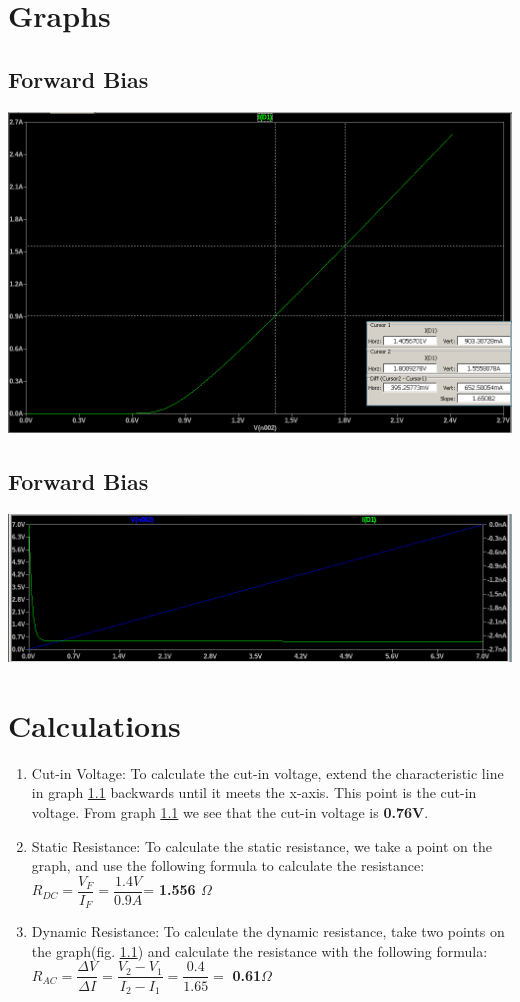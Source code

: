 \documentclass{article}
\begin{document}
	\section{Graphs}
	\subsection{Forward Bias}
		\label{graph:fwd-bias}
		\includegraphics[width=1\linewidth]{"forward bias graph"}
	\subsection{Forward Bias}
		\label{graph:rev-bias}
		\includegraphics[width=1\linewidth]{"reverse bias graph"}
		
	\section{Calculations}
	\begin{enumerate}
		\item Cut-in Voltage: To calculate the cut-in voltage, extend the characteristic line in graph \ref{graph:fwd-bias} backwards until it meets the x-axis. This point is the cut-in voltage. From graph \ref{graph:fwd-bias} we see that the cut-in voltage is \textbf{0.76V}.
		\item Static Resistance: To calculate the static resistance, we take a point on the graph, and use the following formula to calculate the resistance: \\ $ R_{DC}  =\dfrac{V_F}{I_F} = \dfrac{1.4V}{0.9A}$= \textbf{1.556 $ \Omega $}
		\item Dynamic Resistance: To calculate the dynamic resistance, take two points on the graph(fig. \ref{graph:fwd-bias}) and calculate the resistance with the following formula: \\ $ R_{AC} = \dfrac{\Delta V}{\Delta I}  = \dfrac{V_2 - V_1}{I_2 - I_1} = \dfrac{0.4}{1.65}  = $ \textbf{0.61$ \Omega $} \\
	\end{enumerate}
	
\end{document}
